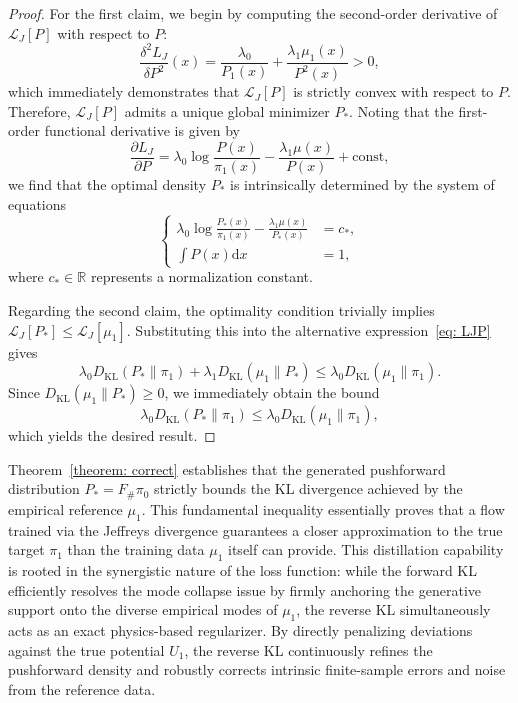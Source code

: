 \documentclass[%
 reprint,
 amsmath,amssymb,
 aps,
 pre,
]{revtex4-2}
\DeclareMathOperator{\KL}{KL}
\newcommand{\D}{\mathrm{d}}
\newcommand{\Ge}{\geqslant}
\newcommand{\Le}{\leqslant}
\begin{document}
\begin{proof}
For the first claim, we begin by computing the second-order derivative of $\mathcal L_J[P]$ with respect to $P$:
\begin{equation*}
	\frac{\delta^2 L_J}{\delta P^2}(x) = \frac{\lambda_0}{P_1(x)} + 
	\frac{\lambda_1 \mu_1(x)}{P^2(x)} > 0,
\end{equation*}
which immediately demonstrates that $\mathcal L_J[P]$ is strictly convex with respect to $P$. Therefore, $\mathcal L_J[P]$ admits a unique global minimizer $P_*$. Noting that the first-order functional derivative is given by
\begin{equation*}
	\frac{\partial L_J}{\partial P} = \lambda_0 \log \frac{P(x)}{\pi_1(x)}
	- \frac{\lambda_1 \mu(x)}{P(x)} + \mathrm{const},
\end{equation*}
we find that the optimal density $P_*$ is intrinsically determined by the system of equations
\begin{equation*}
\left\{
\begin{aligned}
	\lambda_0 \log \frac{P_*(x)}{\pi_1(x)}
	- \frac{\lambda_1 \mu(x)}{P_*(x)} & = c_*, \\
	\int P(x) \D x & = 1,
\end{aligned}
\right.
\end{equation*}
where $c_*\in\mathbb R$ represents a normalization constant. 

Regarding the second claim, the optimality condition trivially implies $\mathcal L_J[P_*] \Le \mathcal L_J[\mu_1]$. Substituting this into the alternative expression~\eqref{eq: LJP} gives
\begin{equation*}
\lambda_0 D_{\KL}(P_*\|\pi_1) + \lambda_1 D_{\KL}(\mu_1\|P_*) \Le 
\lambda_0 D_{\KL}(\mu_1\|\pi_1 ).
\end{equation*}
Since $D_{\KL}(\mu_1\|P_*)\Ge 0$, we immediately obtain the bound
\begin{equation*}
	\lambda_0 D_{\KL}(P_*\|\pi_1) \Le 
	\lambda_0 D_{\KL}(\mu_1\|\pi_1 ),
\end{equation*}
which yields the desired result.
\end{proof}

Theorem~\ref{theorem: correct} establishes that the generated pushforward distribution $P_* = F_\#\pi_0$ strictly bounds the KL divergence achieved by the empirical reference $\mu_1$. This fundamental inequality essentially proves that a flow trained via the Jeffreys divergence guarantees a closer approximation to the true target $\pi_1$ than the training data $\mu_1$ itself can provide. This distillation capability is rooted in the synergistic nature of the loss function: while the forward KL efficiently resolves the mode collapse issue by firmly anchoring the generative support onto the diverse empirical modes of $\mu_1$, the reverse KL simultaneously acts as an exact physics-based regularizer. By directly penalizing deviations against the true potential $U_1$, the reverse KL continuously refines the pushforward density and robustly corrects intrinsic finite-sample errors and noise from the reference data.
\end{document}
